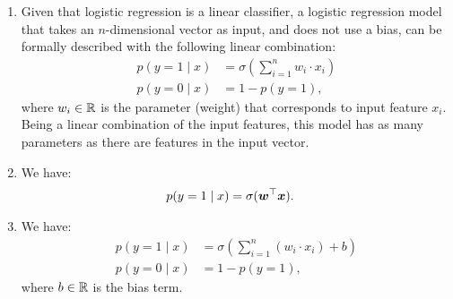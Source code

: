 \documentclass[11pt,a4paper]{article}
\begin{document}
\begin{enumerate}[label=(\alph*)]
    \item Given that logistic regression is a linear classifier, a logistic
          regression model that takes an $n$-dimensional vector as input, and
          does not use a bias, can be formally described with the following
          linear combination:
          \begin{align}
              p(y=1\mid x) & = \sigma\left(\sum_{i=1}^{n}w_i\cdot x_i\right) \\
              p(y=0\mid x) & = 1-p(y=1),
          \end{align}
          where $w_i\in\mathbb{R}$ is the parameter (weight) that corresponds to
          input feature $x_i$. Being a linear combination of the input features,
          this model has as many parameters as there are features in the input
          vector.
    \item We have:
          \begin{align}
              p(y=1\mid x) & = \sigma({\boldsymbol{w}}^\top{\boldsymbol{x}}).
          \end{align}
    \item We have:
          \begin{align}
              p(y=1\mid x) & = \sigma\left(\sum_{i=1}^{n}(w_i\cdot x_i) + b\right) \\
              p(y=0\mid x) & = 1-p(y=1),
          \end{align}
          where $b\in\mathbb{R}$ is the bias term.


\end{enumerate}
\end{document}
